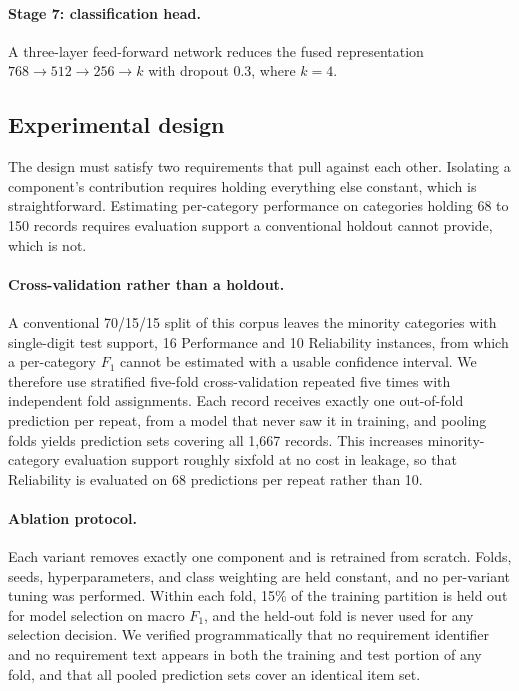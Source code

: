 \documentclass[11pt,a4paper]{article}
\begin{document}
\paragraph{Stage 7: classification head.}
A three-layer feed-forward network reduces the fused representation
$768 \rightarrow 512 \rightarrow 256 \rightarrow k$ with dropout 0.3, where $k = 4$.

\subsection{Experimental design}
\label{sec:design}

The design must satisfy two requirements that pull against each other. Isolating a component's contribution requires holding everything else constant, which is straightforward. Estimating per-category performance on categories holding 68 to 150 records requires evaluation support a conventional holdout cannot provide, which is not.

\paragraph{Cross-validation rather than a holdout.}
A conventional 70/15/15 split of this corpus leaves the minority categories with
single-digit test support, 16 Performance and 10 Reliability instances, from which a
per-category $F_1$ cannot be estimated with a usable confidence interval. We therefore use
stratified five-fold cross-validation repeated five times with independent fold
assignments. Each record receives exactly one out-of-fold prediction per repeat, from a
model that never saw it in training, and pooling folds yields prediction sets covering all
1{,}667 records. This increases minority-category evaluation support roughly sixfold at no cost in leakage, so that Reliability is evaluated on 68 predictions per repeat rather than 10.

\paragraph{Ablation protocol.}
Each variant removes exactly one component and is retrained from scratch. Folds, seeds,
hyperparameters, and class weighting are held constant, and no per-variant tuning was
performed. Within each fold, 15\% of the training partition is held out for model selection on macro $F_1$, and the held-out fold is never used for any selection decision. We verified
programmatically that no requirement identifier and no requirement text appears in both
the training and test portion of any fold, and that all pooled prediction sets cover an
identical item set.
\end{document}

